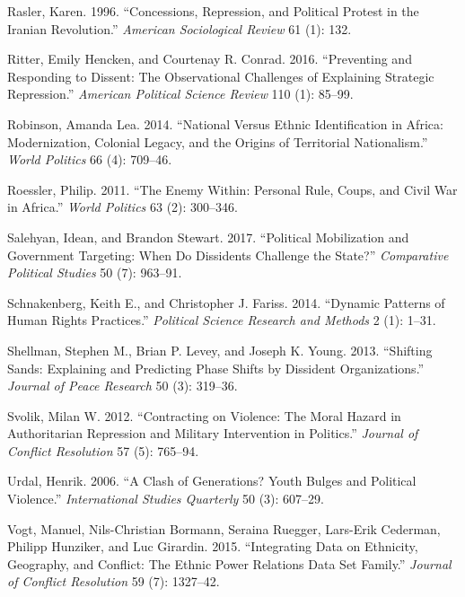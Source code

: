 \documentclass[12pt,]{article}
\theoremstyle{definition}
\theoremstyle{definition}
\theoremstyle{definition}
\theoremstyle{remark}
\begin{document}
\leavevmode\hypertarget{ref-Rasler1996}{}%
Rasler, Karen. 1996. ``Concessions, Repression, and Political Protest in
the Iranian Revolution.'' \emph{American Sociological Review} 61 (1):
132.

\leavevmode\hypertarget{ref-Ritter2016}{}%
Ritter, Emily Hencken, and Courtenay R. Conrad. 2016. ``Preventing and
Responding to Dissent: The Observational Challenges of Explaining
Strategic Repression.'' \emph{American Political Science Review} 110
(1): 85--99.

\leavevmode\hypertarget{ref-Robinson2014}{}%
Robinson, Amanda Lea. 2014. ``National Versus Ethnic Identification in
Africa: Modernization, Colonial Legacy, and the Origins of Territorial
Nationalism.'' \emph{World Politics} 66 (4): 709--46.

\leavevmode\hypertarget{ref-Roessler2011}{}%
Roessler, Philip. 2011. ``The Enemy Within: Personal Rule, Coups, and
Civil War in Africa.'' \emph{World Politics} 63 (2): 300--346.

\leavevmode\hypertarget{ref-Salehyan2017}{}%
Salehyan, Idean, and Brandon Stewart. 2017. ``Political Mobilization and
Government Targeting: When Do Dissidents Challenge the State?''
\emph{Comparative Political Studies} 50 (7): 963--91.

\leavevmode\hypertarget{ref-Schnakenberg2014}{}%
Schnakenberg, Keith E., and Christopher J. Fariss. 2014. ``Dynamic
Patterns of Human Rights Practices.'' \emph{Political Science Research
and Methods} 2 (1): 1--31.

\leavevmode\hypertarget{ref-Shellman2013}{}%
Shellman, Stephen M., Brian P. Levey, and Joseph K. Young. 2013.
``Shifting Sands: Explaining and Predicting Phase Shifts by Dissident
Organizations.'' \emph{Journal of Peace Research} 50 (3): 319--36.

\leavevmode\hypertarget{ref-Svolik2012e}{}%
Svolik, Milan W. 2012. ``Contracting on Violence: The Moral Hazard in
Authoritarian Repression and Military Intervention in Politics.''
\emph{Journal of Conflict Resolution} 57 (5): 765--94.

\leavevmode\hypertarget{ref-Urdal2006}{}%
Urdal, Henrik. 2006. ``A Clash of Generations? Youth Bulges and
Political Violence.'' \emph{International Studies Quarterly} 50 (3):
607--29.

\leavevmode\hypertarget{ref-Vogt2015}{}%
Vogt, Manuel, Nils-Christian Bormann, Seraina Ruegger, Lars-Erik
Cederman, Philipp Hunziker, and Luc Girardin. 2015. ``Integrating Data
on Ethnicity, Geography, and Conflict: The Ethnic Power Relations Data
Set Family.'' \emph{Journal of Conflict Resolution} 59 (7): 1327--42.
\end{document}
